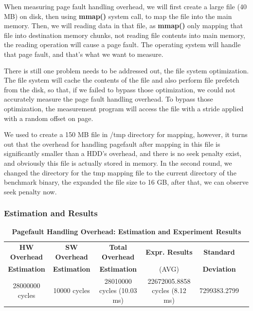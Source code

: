 When measuring page fault handling overhead, we will first create a large file (40 MB) on disk, then using \textbf{mmap()} system call, to map the file into the main memory. Then, we will reading data in that file, as \textbf{mmap()} only mapping that file into destination memory chunks, not reading file contents into main memory, the reading operation will cause a page fault. The operating system will handle that page fault, and that's what we want to measure.

There is still one problem needs to be addressed out, the file system optimization. The file system will cache the contents of the file and also perform file prefetch from the disk, so that, if we failed to bypass those optimization, we could not accurately measure the page fault handling overhead. To bypass those optimization, the measurement program will access the file with a stride applied with a random offset on page.

We used to create a 150 MB file in /tmp directory for mapping, however, it turns out that the overhead for handling pagefault after mapping in this file is significantly smaller than a HDD's overhead, and there is no seek penalty exist, and obviously this file is actually stored in memory. In the second round, we changed the directory for the tmp mapping file to the current directory of the benchmark binary, the expanded the file size to 16 GB, after that, we can observe seek penalty now.

\subsubsection{Estimation and Results}

\begin{table}[ht]
  \centering
  \caption{\textbf{Pagefault Handling Overhead: Estimation and Experiment Results}}
  \begin{threeparttable}
  \begin{tabular}{cccccc}
  \hline
        \textbf{HW Overhead} & \textbf{SW Overhead } & \textbf{Total Overhead} & \textbf{Expr. Results} & \textbf{Standard}\\
        \textbf{Estimation}       &  \textbf{Estimation}         & \textbf{Estimation}  & (AVG)   & \textbf{Deviation} \\
  \hline
        28000000 cycles & 10000 cycles & 28010000 cycles (10.03 ms)  & 22672005.8858 cycles (8.12 ms) & 7299383.2799 \\
  \hline
  \end{tabular}
  \end{threeparttable}
  \label{pagefault_handle_time}
\end{table}

